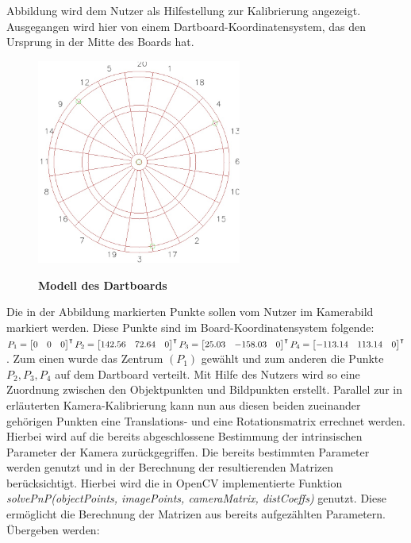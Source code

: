 Abbildung  wird dem Nutzer als Hilfestellung zur Kalibrierung angezeigt. Ausgegangen wird hier von einem Dartboard-Koordinatensystem, das den Ursprung in der Mitte des Boards hat.  
\begin{figure}
\centering
\includegraphics[width=0.6\textwidth]{media/confighints.jpg}\\
\caption{\textbf{Modell des Dartboards}}
\label{Fig:dartmodel}
\end{figure}
Die in der Abbildung markierten Punkte sollen vom Nutzer im Kamerabild markiert werden. 
Diese Punkte sind im Board-Koordinatensystem folgende:
$P_1 = \begin{bmatrix}0& 0& 0 \\\end{bmatrix}^\intercal 
P_2 = \begin{bmatrix}142.56& 72.64& 0 \\\end{bmatrix}^\intercal\\
P_3 = \begin{bmatrix}25.03& -158.03& 0 \\\end{bmatrix}^\intercal
P_4 = \begin{bmatrix}-113.14& 113.14& 0 \\\end{bmatrix}^\intercal$.
Zum einen wurde das Zentrum $(P_1)$ gewählt und zum anderen die Punkte $P_2,P_3,P_4$ auf dem Dartboard verteilt. Mit Hilfe des Nutzers wird so eine Zuordnung zwischen den Objektpunkten und Bildpunkten erstellt. Parallel zur in  erläuterten Kamera-Kalibrierung kann nun aus diesen beiden zueinander gehörigen Punkten eine Translations- und eine Rotationsmatrix errechnet werden. Hierbei wird auf die bereits abgeschlossene Bestimmung der intrinsischen Parameter der Kamera zurückgegriffen. Die bereits bestimmten Parameter werden genutzt und in der Berechnung der resultierenden Matrizen berücksichtigt. Hierbei wird die in OpenCV implementierte Funktion \textit{solvePnP(objectPoints, imagePoints, cameraMatrix, distCoeffs)} genutzt. Diese ermöglicht die Berechnung der Matrizen aus bereits aufgezählten Parametern. Übergeben werden:

